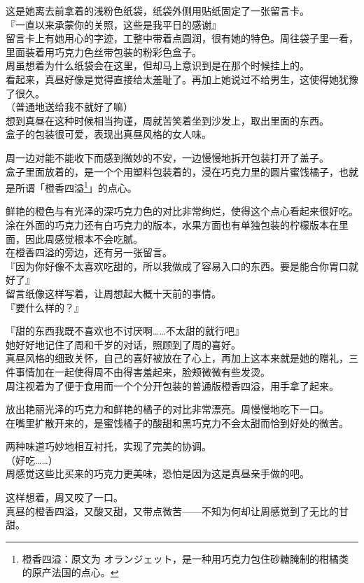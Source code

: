 这是她离去前拿着的浅粉色纸袋，纸袋外侧用贴纸固定了一张留言卡。\\

『一直以来承蒙你的关照，这些是我平日的感谢』\\

留言卡上有她用心的字迹，工整中带着点圆润，很有她的特色。周往袋子里一看，里面装着用巧克力色丝带包装的粉彩色盒子。\\

周虽想着为什么纸袋会在这里，但却马上意识到是在那个时候挂上的。\\

看起来，真昼好像是觉得直接给太羞耻了。再加上她说过不给男生，这使得她犹豫了很久。\\

（普通地送给我不就好了嘛）\\

想到真昼在这种时候相当拘谨，周就苦笑着坐到沙发上，取出里面的东西。\\

盒子的包装很可爱，表现出真昼风格的女人味。

周一边对能不能收下而感到微妙的不安，一边慢慢地拆开包装打开了盖子。\\

盒子里面放着的，是一个个用塑料包装着的，浸在巧克力里的圆片蜜饯橘子，也就是所谓「橙香四溢\footnote{橙香四溢：原文为 {\jpfont オランジェット}，是一种用巧克力包住砂糖腌制的柑橘类的原产法国的点心。}」的点心。

鲜艳的橙色与有光泽的深巧克力色的对比非常绚烂，使得这个点心看起来很好吃。\\

涂在外面的巧克力还有白巧克力的版本，水果方面也有单独包装的柠檬版本在里面，因此周感觉根本不会吃腻。\\

在橙香四溢的旁边，还有另一张留言。\\

『因为你好像不太喜欢吃甜的，所以我做成了容易入口的东西。要是能合你胃口就好了』\\

留言纸像这样写着，让周想起大概十天前的事情。\\

『要什么样的？』

『甜的东西我既不喜欢也不讨厌啊……不太甜的就行吧』\\

她好好地记住了周和千岁的对话，照顾到了周的喜好。\\

真昼风格的细致关怀，自己的喜好被放在了心上，再加上这本来就是她的赠礼，三件事情加在一起使得周不由得害羞起来，脸颊微微有些发烫。\\

周注视着为了便于食用而一个个分开包装的普通版橙香四溢，用手拿了起来。

放出艳丽光泽的巧克力和鲜艳的橘子的对比非常漂亮。周慢慢地吃下一口。\\

在嘴里扩散开来的，是蜜饯橘子的酸甜和黑巧克力不会太甜而恰到好处的微苦。

两种味道巧妙地相互衬托，实现了完美的协调。\\

（好吃……）\\

周感觉这些比买来的巧克力更美味，恐怕是因为这是真昼亲手做的吧。

这样想着，周又咬了一口。\\

真昼的橙香四溢，又酸又甜，又带点微苦——不知为何却让周感觉到了无比的甘甜。
